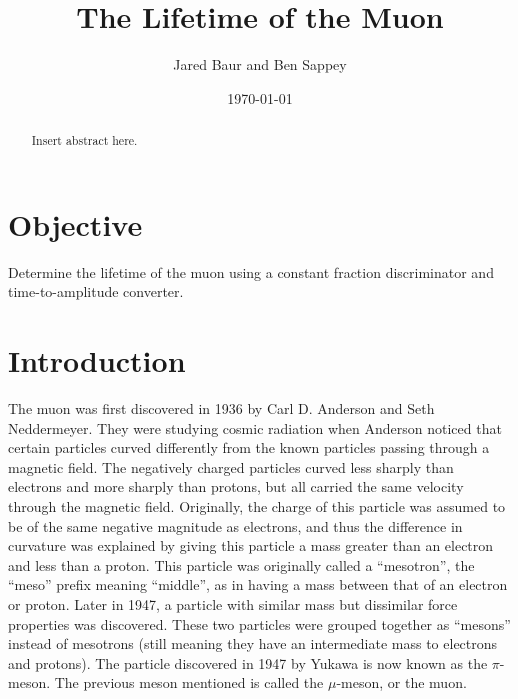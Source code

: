 \documentclass[%
 aip,
 amsmath,amssymb,
 reprint,%
floatfix,
]{revtex4-1}
\begin{document}

\title[]{The Lifetime of the Muon}

\author{Jared Baur and Ben Sappey}

\date{\today}%


\begin{abstract}

	Insert abstract here.

\end{abstract}

\maketitle


\onecolumngrid

\section{\label{sec:level1}Objective}

Determine the lifetime of the muon using a constant fraction discriminator and time-to-amplitude converter.

\section{\label{sec:level2}Introduction}

The muon was first discovered in 1936 by Carl D. Anderson and Seth Neddermeyer. They were studying cosmic radiation when Anderson noticed that certain particles curved differently from the known particles passing through a magnetic field. The negatively charged particles curved less sharply than electrons and more sharply than protons, but all carried the same velocity through the magnetic field. Originally, the charge of this particle was assumed to be of the same negative magnitude as electrons, and thus the difference in curvature was explained by giving this particle a mass greater than an electron and less than a proton. This particle was originally called a “mesotron”, the “meso” prefix meaning “middle”, as in having a mass between that of an electron or proton. Later in 1947, a particle with similar mass but dissimilar force properties was discovered. These two particles were grouped together as “mesons” instead of mesotrons (still meaning they have an intermediate mass to electrons and protons). The particle discovered in 1947 by Yukawa is now known as the $\pi$-meson. The previous meson mentioned is called the $\mu$-meson, or the muon.
\end{document}

